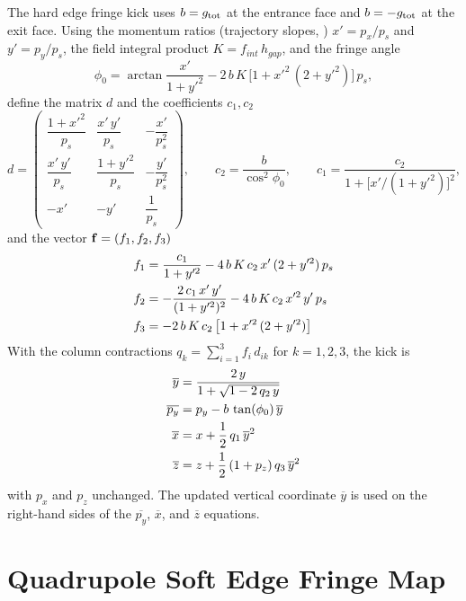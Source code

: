 {The hard edge fringe kick uses $b = g_{\text{tot}}$ at the entrance face and $b = -g_{\text{tot}}$ at the exit face.
Using the momentum ratios (trajectory slopes, ) $x' = p_x / p_s$ and
$y' = p_y / p_s$, the field integral product $K = f_{int} \, h_{gap}$, and the fringe angle
\begin{equation}
  \phi_0 = \arctan \frac{x'}{1 + y'^2}
    - 2 \, b \, K \, \bigl[ 1 + x'^2 \, (2 + y'^2) \bigr] \, p_s,
\end{equation}
define the matrix $d$ and the coefficients $c_1, c_2$
\begin{equation}
  d = \begin{pmatrix}
    \dfrac{1 + x'^2}{p_s} & \dfrac{x' \, y'}{p_s} & -\dfrac{x'}{p_s^2} \\[10pt]
    \dfrac{x' \, y'}{p_s} & \dfrac{1 + y'^2}{p_s} & -\dfrac{y'}{p_s^2} \\[10pt]
    -x' & -y' & \dfrac{1}{p_s}
  \end{pmatrix}, \qquad
  c_2 = \frac{b}{\cos^2 \phi_0}, \qquad
  c_1 = \frac{c_2}{1 + \bigl[x' / (1 + y'^2)\bigr]^2},
\end{equation}
and the vector ${\bf f} = (f_1, f_2, f_3)$
\begin{align}
  f_1 &= \frac{c_1}{1 + y'^2} - 4 \, b \, K \, c_2 \, x' \, (2 + y'^2) \, p_s \nonumber \\
  f_2 &= -\frac{2 \, c_1 \, x' \, y'}{(1 + y'^2)^2} - 4 \, b \, K \, c_2 \, x'^2 \, y' \, p_s \\
  f_3 &= -2 \, b \, K \, c_2 \, \bigl[ 1 + x'^2 \, (2 + y'^2) \bigr] \nonumber
\end{align}
With the column contractions $q_k = \sum_{i=1}^{3} f_i \, d_{ik}$ for $k = 1, 2, 3$, the kick is
\begin{align}
  \overline{y}   &= \frac{2 \, y}{1 + \sqrt{1 - 2 \, q_2 \, y}} \nonumber \\
  \overline{p_y} &= p_y - b \, \tan(\phi_0) \, \overline{y} \nonumber \\
  \overline{x}   &= x + \frac{1}{2} \, q_1 \, \overline{y}^2 \\
  \overline{z}   &= z + \frac{1}{2} \, (1 + p_z) \, q_3 \, \overline{y}^2 \nonumber
\end{align}
with $p_x$ and $p_z$ unchanged. The updated vertical coordinate $\overline{y}$ is used on the
right-hand sides of the $\overline{p_y}$, $\overline{x}$, and $\overline{z}$ equations.

\section{Quadrupole Soft Edge Fringe Map}
\label{s:q.soft}

}
